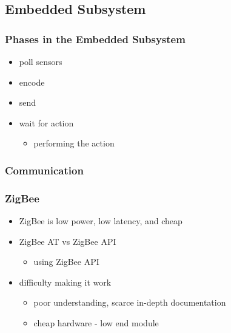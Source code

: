 \subsection{Embedded Subsystem}
  \begin{frame}
	\frametitle{Phases in the Embedded Subsystem}
  	\begin{itemize}
  		\item poll sensors
  		\item encode
  		\item send
  		\item wait for action
        \begin{itemize}
            \item performing the action
        \end{itemize}
  	\end{itemize}
  \end{frame}
  

\subsubsection{Communication}
  \begin{frame}
  	\frametitle{ZigBee}
  	\begin{itemize}
  		\item ZigBee is low power, low latency, and cheap
  		\item ZigBee AT vs ZigBee API
        \begin{itemize}
            \item using ZigBee API
        \end{itemize}
  		\item difficulty making it work
        \begin{itemize}
            \item poor understanding, scarce in-depth documentation
            \item cheap hardware - low end module
        \end{itemize}
  	\end{itemize}
  \end{frame}
  

